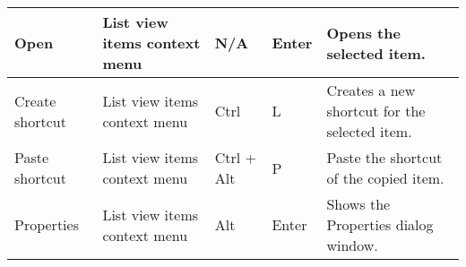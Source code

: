 \documentclass[12pt]{article}
\begin{document}
\begin{tabularx}{\linewidth}{ | X | X | X!{+}X | X | }
\hline

Open & List view items context menu & N/A & Enter & Opens the selected item. \\

\hline

Create shortcut & List view items context menu & Ctrl & L & Creates a new shortcut for the selected item. \\

\hline

Paste shortcut & List view items context menu & Ctrl + Alt & P & Paste the shortcut of the copied item. \\

\hline

Properties & List view items context menu & Alt & Enter & Shows the Properties dialog window. \\

\hline

\end{tabularx}
\end{document}
